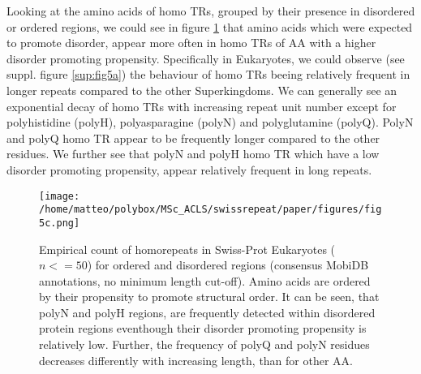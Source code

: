 \documentclass[a4,center,fleqn]{NAR}
\begin{document}

Looking at the amino acids of homo TRs, grouped by their presence in disordered or ordered regions, we could see in figure \ref{fig5c} that amino acids which were expected to promote disorder, appear more often in homo TRs of AA with a higher disorder promoting propensity. 
Specifically in Eukaryotes, we could observe (see suppl. figure \ref{sup:fig5a}) the behaviour of homo TRs beeing relatively frequent in longer repeats compared to the other Superkingdoms. 
We can generally see an exponential decay 
of homo TRs with increasing repeat unit number except for polyhistidine (polyH), polyasparagine (polyN) and polyglutamine (polyQ).
PolyN and polyQ homo TR appear to be frequently longer compared to the other residues. 
We further see that polyN and polyH homo TR which have a low disorder promoting propensity, appear relatively frequent in long repeats.

\begin{figure}[t]
\begin{center}
\texttt{[image: /home/matteo/polybox/MSc\_ACLS/swissrepeat/paper/figures/fig5c.png]}
\end{center}
\caption{Empirical count of homorepeats in Swiss-Prot Eukaryotes ($n <= 50$) for ordered and disordered regions (consensus MobiDB annotations, no minimum length cut-off). Amino acids are ordered by their propensity to promote structural order. It can be seen, that polyN and polyH regions, are frequently detected within disordered protein regions eventhough their disorder promoting propensity is relatively low. Further, the frequency of polyQ and polyN residues decreases differently with increasing length, than for other AA.}
\label{fig5c}
\end{figure}
\end{document}
